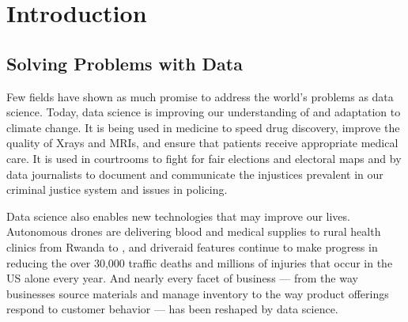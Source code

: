 \documentclass[letterpaper,10pt,english]{jupyterBook}
\begin{document}
\sphinxstepscope


\part{Introduction}

\sphinxstepscope


\chapter{Solving Problems with Data}
\label{\detokenize{10_introduction/10_solving_problems_with_data:solving-problems-with-data}}\label{\detokenize{10_introduction/10_solving_problems_with_data::doc}}
\sphinxAtStartPar
Few fields have shown as much promise to address the world’s problems as data science. Today, data science is improving our understanding of and adaptation to climate change. It is being used in medicine to speed drug discovery, improve the quality of X\sphinxhyphen{}rays and MRIs, and ensure that patients receive appropriate medical care. It is used in courtrooms to fight for fair elections and electoral maps and by data journalists to document and communicate the injustices prevalent in our criminal justice system and issues in policing.

\sphinxAtStartPar
Data science also enables new technologies that may improve our lives. Autonomous drones are delivering blood and medical supplies to rural health clinics from Rwanda to , and driver\sphinxhyphen{}aid features continue to make progress in reducing the over 30,000 traffic deaths and millions of injuries that occur in the US alone every year. And nearly every facet of business — from the way businesses source materials and manage inventory to the way product offerings respond to customer behavior — has been reshaped by data science.
\end{document}
